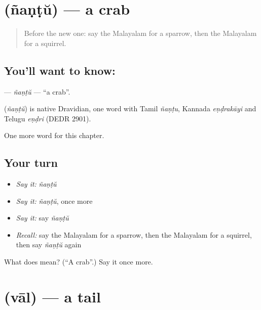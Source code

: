 \section[\texorpdfstring{\ml{ഞണ്ട്} (ñaṇṭŭ)}{ഞണ്ട് (ñaṇṭŭ)}]{ (ñaṇṭŭ) — a crab}

\label{lesson:ML-C254-nantu}



\begin{quote}
Before the new one: say the Malayalam for a sparrow, then the Malayalam for a squirrel.
\end{quote}

\subsection*{You'll want to know: }
\textbf{} — \emph{ñaṇṭŭ} — \textquotedblleft{}a crab\textquotedblright{}.

\begin{cousinweb}
\textbf{} (\emph{ñaṇṭŭ}) is native Dravidian, one word with Tamil \emph{ñaṇṭu}, Kannada \emph{eṇḍrakāyi} and Telugu \emph{eṇḍri} (DEDR 2901).
\end{cousinweb}

\begin{grammarlens}[title={What you've built}]
One more word for this chapter.
\end{grammarlens}

\subsection*{Your turn}
\begin{itemize}
\raggedright
  \item \emph{Say it:} \emph{ñaṇṭŭ}
  \item \emph{Say it:} \emph{ñaṇṭŭ}, once more
  \item \emph{Say it:} say \emph{ñaṇṭŭ}
  \item \emph{Recall:} say the Malayalam for a sparrow, then the Malayalam for a squirrel, then say \emph{ñaṇṭŭ} again
\end{itemize}

\begin{tcolorbox}[breakable,colback=teal!4,colframe=teal!35!black,title={Before you move on}]
What does  mean? (\textquotedblleft{}A crab\textquotedblright{}.) Say it once more.
\end{tcolorbox}
\section[\texorpdfstring{\ml{വാൽ} (vāl)}{വാൽ (vāl)}]{ (vāl) — a tail}

